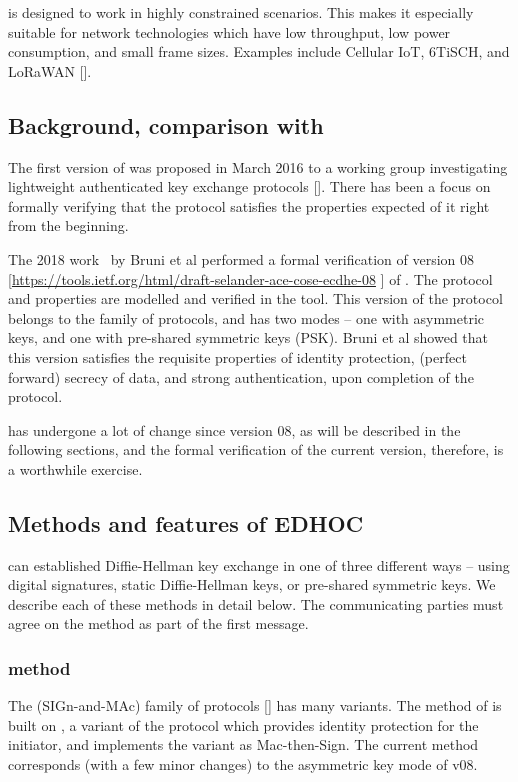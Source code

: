 \mEdhoc is designed to work in highly constrained scenarios. This makes it especially suitable for network technologies which have low throughput, low power consumption, and small frame sizes. Examples include Cellular IoT, 6TiSCH, and LoRaWAN [\mcneed].

\subsection{Background, comparison with~\cite{DBLP:conf/secsr/BruniJPS18}}
The first version of \mEdhoc was proposed in March 2016 to a working group investigating lightweight authenticated key exchange protocols [\mcneed]. There has been a focus on formally verifying that the protocol satisfies the properties expected of it right from the beginning. 

The 2018 work~\cite{DBLP:conf/secsr/BruniJPS18} by Bruni et al performed a formal verification of version 08 [\url{https://tools.ietf.org/html/draft-selander-ace-cose-ecdhe-08} \mcfix] of \mEdhoc. The protocol and properties are modelled and verified in the \mProverif tool. This version of the protocol belongs to the \mSigmaI family of protocols, and has two modes -- one with asymmetric keys, and one with pre-shared symmetric keys (PSK). Bruni et al showed that this version satisfies the requisite properties of identity protection, (perfect forward) secrecy of data, and strong authentication, upon completion of the protocol.

\mEdhoc has undergone a lot of change since version 08, as will be described in the following sections, and the formal verification of the current version, therefore, is a worthwhile exercise.

\subsection{Methods and features of \textsc{EDHOC}}
\mEdhoc can established Diffie-Hellman key exchange in one of three different ways -- using digital signatures, static Diffie-Hellman keys, or pre-shared symmetric keys. We describe each of these methods in detail below. The communicating parties must agree on the method as part of the first message.

\subsubsection{\mSigSig method}
The \mSigma (SIGn-and-MAc) family of protocols [\mcneed] has many variants. The \mSigSig method of \mEdhoc is built on \mSigmaI, a variant of the \mSigma protocol which provides identity protection for the initiator, and  implements the \mSigmaI variant as Mac-then-Sign. The current \mSigSig method corresponds (with a few minor changes) to the asymmetric key mode of \mEdhoc v08. 


